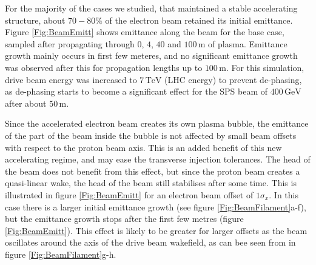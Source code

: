 \documentclass[aps,prstab,reprint,amsmath,amssymb,groupedaddress]{revtex4-1}
\newcommand{\unit}[1]{\,\mathrm{#1}}
\begin{document}

For the majority of the cases we studied, that maintained a stable accelerating structure, about $70-80\%$ of the
electron beam retained its initial emittance. Figure \ref{Fig:BeamEmitt} shows emittance along the beam for the base
case, sampled after propagating through $0$, $4$, $40$ and $100\unit{m}$ of plasma. Emittance growth mainly occurs in
first few meteres, and no significant emittance growth was observed after this for propagation lengths up to
$100\unit{m}$. For this simulation, drive beam energy was increased to $7\unit{TeV}$ (LHC energy) to prevent de-phasing,
as de-phasing starts to become a significant effect for the SPS beam of $400\unit{GeV}$ after about $50\unit{m}$.


Since the accelerated electron beam creates its own plasma bubble, the emittance of the part of the beam inside the
bubble is not affected by small beam offsets with respect to the proton beam axis. This is an added benefit of this new
accelerating regime, and may ease the transverse injection tolerances. The head of the beam does not benefit from this
effect, but since the proton beam creates a quasi-linear wake, the head of the beam still stabilises after some time.
This is illustrated in figure \ref{Fig:BeamEmitt} for an electron beam offset of $1\sigma_{x}$. In this case there is a
larger initial emittance growth (see figure \ref{Fig:BeamFilament}a-f), but the emittance growth stops after the first
few metres (figure \ref{Fig:BeamEmitt}). This effect is likely to be greater for larger offsets as the beam oscillates
around the axis of the drive beam wakefield, as can bee seen from in figure \ref{Fig:BeamFilament}g-h.
\end{document}
